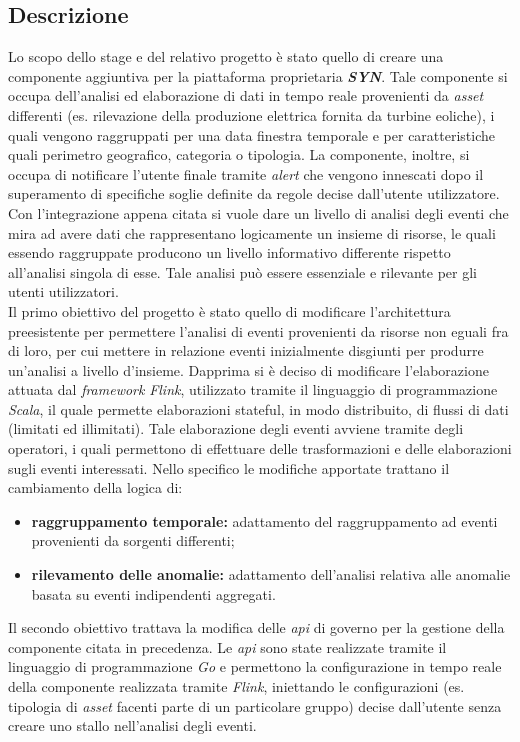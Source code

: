 \subsection{Descrizione}

Lo scopo dello stage e del relativo progetto è stato quello di creare una componente aggiuntiva per la piattaforma proprietaria \textbf{\textit{SYN}}. Tale componente si occupa dell'analisi ed elaborazione di dati in tempo reale provenienti da \textit{asset} differenti (es. rilevazione della produzione elettrica fornita da turbine eoliche), i quali vengono raggruppati per una data finestra temporale e per caratteristiche quali perimetro geografico, categoria o tipologia. La componente, inoltre,
si occupa di notificare l'utente finale tramite \textit{alert} che vengono innescati dopo il superamento di specifiche soglie definite da regole decise dall'utente utilizzatore.\\
Con l'integrazione appena citata si vuole dare un livello di analisi degli eventi che mira ad avere dati che rappresentano logicamente un insieme di risorse, le quali essendo raggruppate producono un livello informativo differente rispetto all'analisi singola di esse. Tale analisi può essere essenziale e rilevante per gli utenti utilizzatori.\\
Il primo obiettivo del progetto è stato quello di modificare l'architettura preesistente per permettere l'analisi di eventi provenienti da risorse non eguali fra di loro, per cui mettere in relazione eventi inizialmente disgiunti per produrre un'analisi a livello d'insieme. Dapprima si è deciso di modificare l'elaborazione attuata dal \textit{\gls{framework}} \textit{Flink}, utilizzato tramite il linguaggio di programmazione \textit{Scala}, il quale permette elaborazioni \gls{stateful}, in modo distribuito, di flussi di dati (limitati ed illimitati). Tale elaborazione degli eventi avviene tramite degli operatori, i quali permettono di effettuare delle trasformazioni e delle elaborazioni sugli eventi interessati. Nello specifico le modifiche apportate trattano il cambiamento della logica di:
\begin{itemize}
	\item{\textbf{raggruppamento temporale:} adattamento del raggruppamento ad eventi provenienti da sorgenti differenti;}
	\item{\textbf{rilevamento delle anomalie:} adattamento dell'analisi relativa alle anomalie basata su eventi indipendenti aggregati.}
\end{itemize}
Il secondo obiettivo trattava la modifica delle \textit{\gls{api}} di governo per la gestione della componente citata in precedenza. Le \textit{\gls{api}} sono state realizzate tramite il linguaggio di programmazione \textit{Go} e permettono la configurazione in tempo reale della componente realizzata tramite \textit{Flink}, iniettando le configurazioni (es. tipologia di \textit{asset} facenti parte di un particolare gruppo) decise dall'utente senza creare uno stallo nell'analisi degli eventi.

